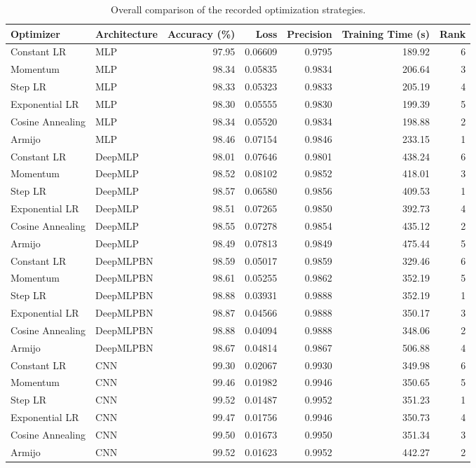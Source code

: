 \begin{table}[ht]
\centering
\caption{Overall comparison of the recorded optimization strategies.}
\label{tab:overall_results}
\begin{tabular}{llrrrrr}
\hline
Optimizer & Architecture & Accuracy (\%) & Loss & Precision & Training Time (s) & Rank \\
\hline
Constant LR & MLP & 97.95 & 0.06609 & 0.9795 & 189.92 & 6 \\
Momentum & MLP & 98.34 & 0.05835 & 0.9834 & 206.64 & 3 \\
Step LR & MLP & 98.33 & 0.05323 & 0.9833 & 205.19 & 4 \\
Exponential LR & MLP & 98.30 & 0.05555 & 0.9830 & 199.39 & 5 \\
Cosine Annealing & MLP & 98.34 & 0.05520 & 0.9834 & 198.88 & 2 \\
Armijo & MLP & 98.46 & 0.07154 & 0.9846 & 233.15 & 1 \\
Constant LR & DeepMLP & 98.01 & 0.07646 & 0.9801 & 438.24 & 6 \\
Momentum & DeepMLP & 98.52 & 0.08102 & 0.9852 & 418.01 & 3 \\
Step LR & DeepMLP & 98.57 & 0.06580 & 0.9856 & 409.53 & 1 \\
Exponential LR & DeepMLP & 98.51 & 0.07265 & 0.9850 & 392.73 & 4 \\
Cosine Annealing & DeepMLP & 98.55 & 0.07278 & 0.9854 & 435.12 & 2 \\
Armijo & DeepMLP & 98.49 & 0.07813 & 0.9849 & 475.44 & 5 \\
Constant LR & DeepMLPBN & 98.59 & 0.05017 & 0.9859 & 329.46 & 6 \\
Momentum & DeepMLPBN & 98.61 & 0.05255 & 0.9862 & 352.19 & 5 \\
Step LR & DeepMLPBN & 98.88 & 0.03931 & 0.9888 & 352.19 & 1 \\
Exponential LR & DeepMLPBN & 98.87 & 0.04566 & 0.9888 & 350.17 & 3 \\
Cosine Annealing & DeepMLPBN & 98.88 & 0.04094 & 0.9888 & 348.06 & 2 \\
Armijo & DeepMLPBN & 98.67 & 0.04814 & 0.9867 & 506.88 & 4 \\
Constant LR & CNN & 99.30 & 0.02067 & 0.9930 & 349.98 & 6 \\
Momentum & CNN & 99.46 & 0.01982 & 0.9946 & 350.65 & 5 \\
Step LR & CNN & 99.52 & 0.01487 & 0.9952 & 351.23 & 1 \\
Exponential LR & CNN & 99.47 & 0.01756 & 0.9946 & 350.73 & 4 \\
Cosine Annealing & CNN & 99.50 & 0.01673 & 0.9950 & 351.34 & 3 \\
Armijo & CNN & 99.52 & 0.01623 & 0.9952 & 442.27 & 2 \\
\hline
\end{tabular}
\end{table}

